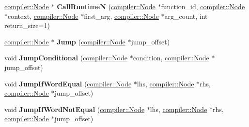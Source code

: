 \begin{DoxyCompactItemize}
\item 
\hyperlink{classv8_1_1internal_1_1compiler_1_1_node}{compiler\+::\+Node} $\ast$ {\bfseries Call\+RuntimeN} (\hyperlink{classv8_1_1internal_1_1compiler_1_1_node}{compiler\+::\+Node} $\ast$function\+\_\+id, \hyperlink{classv8_1_1internal_1_1compiler_1_1_node}{compiler\+::\+Node} $\ast$context, \hyperlink{classv8_1_1internal_1_1compiler_1_1_node}{compiler\+::\+Node} $\ast$first\+\_\+arg, \hyperlink{classv8_1_1internal_1_1compiler_1_1_node}{compiler\+::\+Node} $\ast$arg\+\_\+count, int return\+\_\+size=1)\hypertarget{classv8_1_1internal_1_1interpreter_1_1_interpreter_assembler_a071f413204dc4941cdf0fb686e21cefd}{}\label{classv8_1_1internal_1_1interpreter_1_1_interpreter_assembler_a071f413204dc4941cdf0fb686e21cefd}

\item 
\hyperlink{classv8_1_1internal_1_1compiler_1_1_node}{compiler\+::\+Node} $\ast$ {\bfseries Jump} (\hyperlink{classv8_1_1internal_1_1compiler_1_1_node}{compiler\+::\+Node} $\ast$jump\+\_\+offset)\hypertarget{classv8_1_1internal_1_1interpreter_1_1_interpreter_assembler_acf182a373ce613df922c02a956933d1b}{}\label{classv8_1_1internal_1_1interpreter_1_1_interpreter_assembler_acf182a373ce613df922c02a956933d1b}

\item 
void {\bfseries Jump\+Conditional} (\hyperlink{classv8_1_1internal_1_1compiler_1_1_node}{compiler\+::\+Node} $\ast$condition, \hyperlink{classv8_1_1internal_1_1compiler_1_1_node}{compiler\+::\+Node} $\ast$jump\+\_\+offset)\hypertarget{classv8_1_1internal_1_1interpreter_1_1_interpreter_assembler_afc7b8e3d848bee02820220c2356add27}{}\label{classv8_1_1internal_1_1interpreter_1_1_interpreter_assembler_afc7b8e3d848bee02820220c2356add27}

\item 
void {\bfseries Jump\+If\+Word\+Equal} (\hyperlink{classv8_1_1internal_1_1compiler_1_1_node}{compiler\+::\+Node} $\ast$lhs, \hyperlink{classv8_1_1internal_1_1compiler_1_1_node}{compiler\+::\+Node} $\ast$rhs, \hyperlink{classv8_1_1internal_1_1compiler_1_1_node}{compiler\+::\+Node} $\ast$jump\+\_\+offset)\hypertarget{classv8_1_1internal_1_1interpreter_1_1_interpreter_assembler_a66286a230572b62fc91c76dadc39a923}{}\label{classv8_1_1internal_1_1interpreter_1_1_interpreter_assembler_a66286a230572b62fc91c76dadc39a923}

\item 
void {\bfseries Jump\+If\+Word\+Not\+Equal} (\hyperlink{classv8_1_1internal_1_1compiler_1_1_node}{compiler\+::\+Node} $\ast$lhs, \hyperlink{classv8_1_1internal_1_1compiler_1_1_node}{compiler\+::\+Node} $\ast$rhs, \hyperlink{classv8_1_1internal_1_1compiler_1_1_node}{compiler\+::\+Node} $\ast$jump\+\_\+offset)\hypertarget{classv8_1_1internal_1_1interpreter_1_1_interpreter_assembler_a15e098e3f472372024a94a21aaf34e79}{}\label{classv8_1_1internal_1_1interpreter_1_1_interpreter_assembler_a15e098e3f472372024a94a21aaf34e79}


\end{DoxyCompactItemize}
